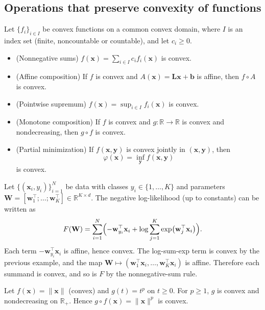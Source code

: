 \subsection{Operations that preserve convexity of functions}
\label{sec:ch4-function-operations}
\begin{claim}
  Let $\{f_i\}_{i\in I}$ be convex functions on a common convex domain, 
  where $I$ is an index set (finite, noncountable or countable),
  and let $c_i\ge 0$.
\begin{itemize}
  \item (Nonnegative sums) $f(\mathbf{x})=\sum_{i\in I} c_i f_i(\mathbf{x})$ is convex.
  \item (Affine composition) If $f$ is convex and $A(\mathbf{x})=\mathbf{L}\mathbf{x}+\mathbf{b}$ is affine, then $f\circ A$ is convex.
  \item (Pointwise supremum) $f(\mathbf{x})=\sup_{i\in I} f_i(\mathbf{x})$ is convex.
  \item (Monotone composition) If $f$ is convex and $g:\mathbb{R}\to\mathbb{R}$ is convex and nondecreasing, then $g\circ f$ is convex.
  \item (Partial minimization) If $f(\mathbf{x},\mathbf{y})$ is convex jointly in $(\mathbf{x},\mathbf{y})$, then
  \[
    \varphi(\mathbf{x})=\inf_{\mathbf{y}} f(\mathbf{x},\mathbf{y})
  \]
  is convex. 
\end{itemize}
\end{claim}


\begin{example}
Let $\{(\mathbf{x}_i,y_i)\}_{i=1}^N$ be data with classes $y_i\in\{1,\ldots,K\}$ and parameters
$\mathbf{W}=[\mathbf{w}_1^\top;\ldots;\mathbf{w}_K^\top]\in\mathbb{R}^{K\times d}$. The negative log-likelihood 
(up to constants) can be written as
\[
  F(\mathbf{W})
  =\sum_{i=1}^N\Bigl(-\mathbf{w}_{y_i}^\top \mathbf{x}_i+\log\sum_{j=1}^K \exp(\mathbf{w}_j^\top \mathbf{x}_i)\Bigr).
\]
Each term $-\mathbf{w}_{y_i}^\top \mathbf{x}_i$ is affine, hence convex.
The log-sum-exp term is convex by the previous example, and the map 
$\mathbf{W}\mapsto(\mathbf{w}_1^\top\mathbf{x}_i,\ldots,\mathbf{w}_K^\top\mathbf{x}_i)$
is affine. Therefore each summand is convex, and so is $F$ by the nonnegative-sum rule.
\end{example}

\begin{example}
Let $f(\mathbf{x})=\|\mathbf{x}\|$ (convex) and $g(t)=t^p$ on $t\ge 0$.
For $p\ge 1$, $g$ is convex and nondecreasing on $\mathbb{R}_+$. Hence $g\circ f(\mathbf{x})=\|\mathbf{x}\|^p$ is convex.
\end{example}


